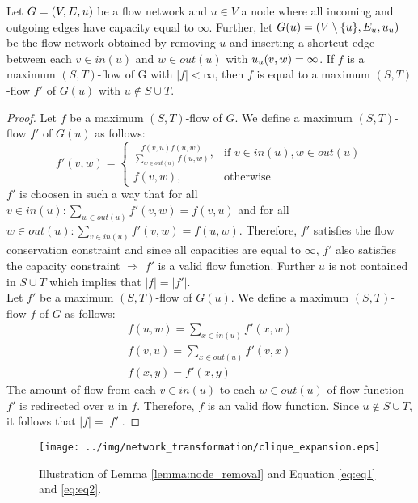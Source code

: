 \begin{lemma}
\label{lemma:node_removal}
Let $G = (V,E,u)$ be a flow network and $u \in V$ a node where
all incoming and outgoing edges have capacity equal to $\infty$.
Further, let $G(u) = (V\setminus\{u\}, E_u, u_u)$ be the flow network obtained by removing
$u$ and inserting a shortcut edge between each $v \in in(u)$ and $w \in out(u)$ with $u_u(v,w) = \infty$.
If $f$ is a maximum $(S,T)$-flow of G with $|f| < \infty$, then $f$ is equal to a maximum
$(S,T)$-flow $f'$ of $G(u)$ with $u \notin S \cup T$.
\end{lemma}

\begin{proof}
Let $f$ be a maximum $(S,T)$-flow of $G$. We define a maximum $(S,T)$-flow $f'$ 
of $G(u)$ as follows:
\begin{equation}
\label{eq:eq1}
f'(v,w) =  
  \begin{cases}
      \frac{f(v,u)f(u,w)}{\sum_{w \in out(u)} f(u,w)}, & \text{if } v \in in(u), w \in out(u) \\
      f(v,w), & \text{otherwise}
   \end{cases} 
\end{equation}
$f'$ is choosen in such a way that for all $v \in in(u): \sum_{w \in out(u)} f'(v,w) = f(v,u)$
and for all $w \in out(u): \sum_{v \in in(u)} f'(v,w) = f(u,w)$. Therefore, $f'$
satisfies the flow conservation constraint and since all capacities are equal to $\infty$, $f'$
also satisfies the capacity constraint $\Rightarrow$ $f'$ is a valid flow function. Further
$u$ is not contained in $S\cup T$ which implies that $|f| = |f'|$. \\
Let $f'$ be a maximum $(S,T)$-flow of $G(u)$. We define a maximum $(S,T)$-flow $f$
of $G$ as follows:
\begin{align}
\label{eq:eq2}
f(u,w) = \sum_{x \in in(u)} f'(x,w) \nonumber \\
f(v,u) = \sum_{x \in out(u)} f'(v,x) \\
f(x,y) = f'(x,y) \nonumber
\end{align}
The amount of flow from each $v \in in(u)$ to each $w \in out(u)$ of flow function
$f'$ is redirected over $u$ in $f$. Therefore, $f$ is an valid flow function.
Since $u \notin S\cup T$, it follows that $|f| = |f'|$.
\end{proof}

\begin{figure}
\centering
\texttt{[image: ../img/network\_transformation/clique\_expansion.eps]}
\caption{Illustration of Lemma \ref{lemma:node_removal} and Equation \ref{eq:eq1} and \ref{eq:eq2}.}
\label{img:clique_expansion}
\end{figure}

